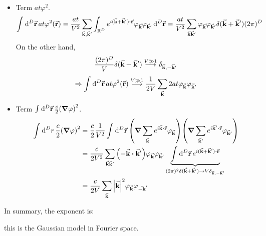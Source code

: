 \documentclass[../main/main.tex]{subfiles}
\begin{document}
\begin{itemize}
\item Term \( a t \varphi ^2 \).
\begin{equation}
  \int_{}^{} \dd[D]{\va{r}} a t \varphi ^2 (\va{r}) = \frac{a t}{V^2} \sum_{\va{k},\va{k}'}^{}  \int_{\R^D}^{} e^{i (\va{k}+\va{k}') \vdot \va{r}} \varphi _{\va{k}} \varphi _{\va{k}'} \dd[D]{\va{r}}
  = \frac{at}{V^2} \sum_{\va{k}\va{k}'}^{} \varphi _{\va{k}} \varphi _{\va{k}'} \delta (\va{k}+\va{k}') (2 \pi )^D
\end{equation}
On the other hand,
\begin{equation}
  \frac{(2 \pi )^D}{V} \delta (\va{k}+ \va{k}') \overset{V \gg 1}{\longrightarrow} \delta _{\va{k},-\va{k}'}
\end{equation}
\begin{equation}
  \Rightarrow \int_{}^{} \dd[D]{\va{r}} a t \varphi ^2 (\va{r})  \overset{V \gg 1}{\longrightarrow} \frac{1}{2V} \sum_{\va{k}}^{} 2 a t  \varphi _{\va{k}} \varphi _{\va{k}'}
\end{equation}
\item Term \( \int_{}^{} \dd[D]{\va{r}} \frac{c}{2} \qty(\grad \varphi )^2    \).
\begin{equation}
\begin{split}
  \int_{}^{} \dd[D]{r} \frac{c}{2} \qty(\grad \varphi )^2 & = \frac{c}{2} \frac{1}{V^2} \int_{}^{} \dd[D]{\va{r}} \qty(\grad \sum_{\va{k}}^{} e^{i \va{k} \vdot \va{r}} \varphi _{\va{k}}  ) \qty(\grad \sum_{\va{k}'}^{} e^{i \va{k}' \vdot \va{r} } \varphi _{\va{k}'}  )     \\
  & = \frac{c}{2 V^2} \sum_{\va{k} \va{k}'}^{}  \qty(- \va{k} \vdot \va{k}') \varphi _{\va{k}} \varphi _{\va{k}'} \underbrace{\int_{}^{} \dd[D]{\va{r}}  e^{i (\va{k}+\va{k}')\vdot \va{r}}}_{(2 \pi )^2 \delta (\va{k}+ \va{k}') \rightarrow V \delta _{\va{k},-\va{k}'}}   \\
  & = \frac{c}{2V} \sum_{\va{k}}^{} \abs{\va{k}}^2 \varphi _{\va{k}} \varphi _{\va{-k}'}
\end{split}
\end{equation}
\end{itemize}
In summary, the exponent is:
this is the Gaussian model in Fourier space.
\end{document}
